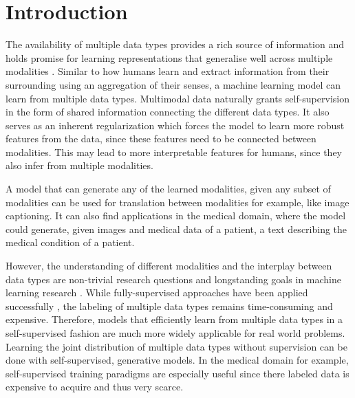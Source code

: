 \chapter{Introduction}
The availability of multiple data types provides a rich source of information and holds promise for learning representations that generalise well across multiple modalities \citep{baltrusaitis_multimodal_2019}.
Similar to how humans learn and extract information from their surrounding using an aggregation of their senses, a machine learning model can learn from multiple data types.
Multimodal data naturally grants self-supervision in the form of shared information connecting the different data types.
It also serves as an inherent regularization which forces the model to learn more robust features from the data, since these features need to be connected between modalities.
This may lead to more interpretable features for humans, since they also infer from multiple modalities.

A model that can generate any of the learned modalities, given any subset of modalities can be used for translation between modalities for example, like image captioning.
It can also find applications in the medical domain, where the model could generate, given images and medical data of a patient, a text describing the medical condition of a patient.

However, the understanding of different modalities and the interplay between data types are non-trivial research questions and longstanding goals in machine learning research \citep{ngiam_multimodal_nodate}.
While fully-supervised approaches have been applied successfully \citep{karpathy_deep_2015,tsai_learning_2018}, the labeling of multiple data types remains time-consuming and expensive.
Therefore, models that efficiently learn from multiple data types in a self-supervised fashion are much more widely applicable for real world problems.
Learning the joint distribution of multiple data types without supervision can be done with self-supervised, generative models.
In the medical domain for example, self-supervised training paradigms are especially useful since there labeled data is expensive to acquire and thus very scarce.

